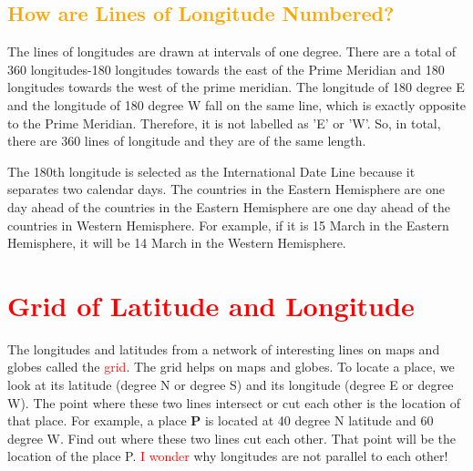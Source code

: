 \subsection{\textcolor{orange}{How are Lines of Longitude Numbered?}}
The lines of longitudes are drawn at intervals of one degree. There are a total of 360 longitudes-180 longitudes towards the east of the Prime Meridian and 180 longitudes towards the west of the prime meridian. The longitude of 180 degree E and the longitude of 180 degree W fall on the same line, which is exactly opposite to the Prime Meridian. Therefore, it is not labelled as 'E' or 'W'. So, in total, there are 360 lines of longitude and they are of the same length.
\vspace{0.1in}
\par
The 180th longitude is selected as the International Date Line because it separates two calendar days. The countries in the Eastern Hemisphere are one day ahead of the countries in the Eastern Hemisphere are one day ahead of the countries in Western Hemisphere. For example, if it is 15 March in the Eastern Hemisphere, it will be 14 March in the Western Hemisphere.
\vspace{0.32in}
\section{\textcolor{red}{Grid of Latitude and Longitude}}
The longitudes and latitudes from a network of interesting lines on maps and globes called the \textcolor{red}{grid}. The grid helps on maps and globes. To locate a place, we look at its latitude (degree N or degree S) and its longitude (degree E or degree W). The point where these two lines intersect or cut each other is the location of that place. For example, a place \textbf{P} is located at 40 degree N latitude and 60 degree W. Find out where these two lines cut each other. That point will be the location of the place P.
\hspace{2.3in}
\textcolor{red}{I wonder} why longitudes are not parallel to each other!
\vspace{3.1in}
